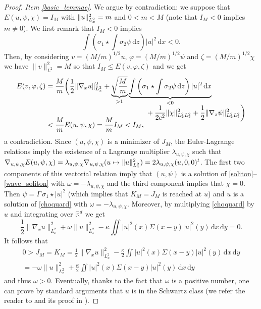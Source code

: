 \documentclass[10pt]{amsart}
\newcommand\mto{\mathchoice{\longmapsto}{\mapsto}{\mapsto}{\mapsto}}
\theoremstyle{definition}
\newcommand{\R}{\mathbb{R}}
\newcommand{\ud}{\, {\mathrm{d}}}
\begin{document}
\begin{proof}
\textit{Item \eqref{basic_lemmae}}. We argue by contradiction: we suppose that $E(u,\psi,\chi)=I_{M}$ with $\|u\|_{L_{x}^{2}}^{2}=\nobreak m$ and $0<m<M$ (note that $I_{M}<0$ implies $m\neq 0$). We first remark that $I_{M}<0$ implies
\[
\int\left(\sigma_{1}\star\int\sigma_{2}\psi\ud z\right)|u|^{2}\ud x<0.
\]
Then, by considering $v=(M/m)^{1/2}u$, $\varphi=(M/m)^{1/2}\psi$ and $\zeta=(M/m)^{1/2}\chi$ we
have $\|v\|_{L^2}^2=M$ so that $I_{M}\leq E(v,\varphi,\zeta)$
and we get\vspace*{-3pt}
\begin{align*}
E(v,\varphi,\zeta)
&=\frac{M}{m}\biggl(\frac{1}{2}\|\nabla_{x}u\|_{L_{x}^{2}}^{2}+\underbrace{\sqrt{\frac{M}{m}}}_{>1}\underbrace{\int\left(\sigma_{1}\star\int\sigma_{2}\psi\ud z\right)|u|^{2}\ud x}_{<0}
\\[
-5pt]
&\hspace*{5cm}+\frac{1}{2c^{2}}\|\chi\|_{L_{x}^{2}L_{z}^{2}}^{2}+\frac{1}{2}\|\nabla_{z}\psi\|_{L_{x}^{2}L_{z}^{2}}^{2}\biggr)\\[
-10pt]
& <\frac{M}{m}E(u,\psi,\chi)=\frac{M}{m}I_{M}<I_{M},
\end{align*}
a contradiction. Since $(u,\psi,\chi)$ is a minimizer of $J_{M}$, the Euler-Lagrange relations imply the existence of a Lagrange multiplier $\lambda_{u,\psi,\chi}$ such that $\nabla_{u,\psi,\chi}E(u,\psi,\chi)=\lambda_{u,\psi,\chi}\nabla_{u,\psi,\chi}(u\mto\|u\|_{L_{x}^{2}}^{2})=2\lambda_{u,\psi,\chi}(u,0,0)^{t}$. The first two components of this vectorial relation imply that $(u,\psi)$ is a solution of \eqref{soliton}--\eqref{wave_soliton} with $\omega=-\lambda_{u,\psi,\chi}$ and the third component implies that $\chi=0$. Then $\psi=\Gamma\,\sigma_{1}\star|u|^{2}$ (which implies that $K_{M}=J_{M}$ is reached at $u$) and $u$ is a solution of \eqref{choquard} with $\omega=-\lambda_{u,\psi,\chi}$. Moreover, by multiplying \eqref{choquard} by $u$ and integrating over $\R^{d}$ we get\vspace*{-3pt}
\[
\frac{1}{2}\|\nabla_{x}u\|_{L_{x}^{2}}^{2}+\omega\|u\|_{L_{x}^{2}}^{2}-\kappa\iint|u|^{2}(x)\Sigma(x-y)|u|^{2}(y)\ud x\ud y=0.
\]
It follows that\vspace*{-5pt}
\begin{multline*}
0>J_{M}=K_{M}=\frac{1}{2}\|\nabla_{x}u\|_{L_{x}^{2}}^{2}-\frac{\kappa}{2}\iint|u|^{2}(x)\Sigma(x-y)|u|^{2}(y)\ud x\ud y\\
=-\omega\|u\|_{L_{x}^{2}}^{2}+\frac{\kappa}{2}\iint|u|^{2}(x)\Sigma(x-y)|u|^{2}(y)\ud x\ud y
\end{multline*}
and thus $\omega>0$. Eventually, thanks to the fact that $\omega$ is a positive number, one can prove by standard arguments that $u$ is in the Schwartz class (we refer the reader to \cite[Th.\,8]{Lieb_Choquard} and its proof in \cite[Rem.\,1]{Lions_Choquard}).


\end{proof}
\end{document}
